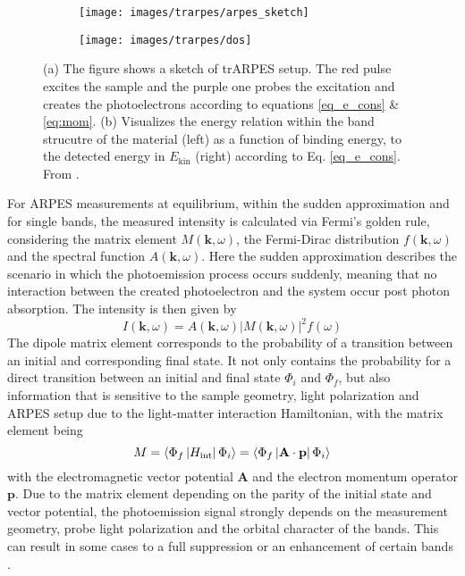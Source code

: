 \begin{figure}
	\centering
	\begin{subfigure}[b]{0.49\textwidth}
		\texttt{[image: images/trarpes/arpes\_sketch]}
		\caption{}
	\end{subfigure}
	\hfill
	\begin{subfigure}[b]{0.4\textwidth}
		\texttt{[image: images/trarpes/dos]}
		\caption{}
	\end{subfigure}
	\caption{(a) The figure shows a sketch of trARPES setup. The red pulse excites the sample and the purple one probes the excitation and creates the photoelectrons according to equations \ref{eq_e_cons} \& \ref{eq:mom}. (b) Visualizes the energy relation within the band strucutre of the material (left) as a function of binding energy, to the detected energy in $E_\text{kin}$ (right) according to Eq. \ref{eq_e_cons}. From \cite{hufner_photoelectron_1995}.}
	\label{fig:arpes_sketch}
\end{figure}

For ARPES measurements at equilibrium, within the sudden approximation and for single bands, the measured intensity is calculated via Fermi's golden rule, considering the matrix element $M(\mathbf{k}, \omega)$, the Fermi-Dirac distribution $f(\mathbf{k}, \omega)$ and the spectral function $A(\mathbf{k}, \omega)$.
Here the sudden approximation describes the scenario in which the photoemission process occurs suddenly, meaning that no interaction between the created photoelectron and the system occur post photon absorption.
The intensity is then given by
\begin{equation}
	I(\mathbf{k}, \omega) = A(\mathbf{k}, \omega)\left|M(\mathbf{k}, \omega)\right|^2f(\omega)
	\label{eq:arpes_signal}
\end{equation}
The dipole matrix element corresponds to the probability of a transition between an initial and corresponding final state.
It not only contains the probability for a direct transition between an initial and final state $\Phi_i$ and $\Phi_f$, but also information that is sensitive to the sample geometry, light polarization and ARPES setup due to the light-matter interaction Hamiltonian,
with the matrix element being
\begin{equation}
	M = \braket{\Phi_f\left|H_\text{int}\right|\Phi_i} =\braket{\Phi_f\left| \mathbf{A} \cdot \mathbf{p} \right|\Phi_i}
\end{equation}
with the electromagnetic vector potential $\mathbf{A}$ and the electron momentum operator $\mathbf{p}$.
Due to the matrix element depending on the parity of the initial state and vector potential, the photoemission signal strongly depends on the measurement geometry, probe light polarization and the orbital character of the bands.
This can result in some cases to a full suppression or an enhancement of certain bands \cite{gierz_illuminating_2011, cao_mapping_2013,zhu_layer-by-layer_2013,schuler_polarization-modulated_2022}.

